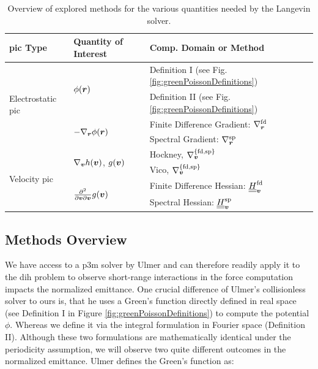 \begin{table}[h]
    \renewcommand*\arraystretch{1.5}
    \centering
    \caption{Overview of explored  methods for the various quantities needed by the Langevin solver.}
    \label{table:langevinPossibleMethods}
    \begin{tabular}{|l|l|l|}
\hline
\textbf{\gls{pic} Type}                           & \textbf{Quantity of Interest}
                                            & \textbf{Comp. Domain or Method}     \\ \hline
\multirow{4}{*}{Electrostatic \gls{pic}} & \multirow{2}{*}{$\phi(\boldsymbol{r})$}
                                         & Definition I (see Fig. \ref{fig:greenPoissonDefinitions})  \\ \cline{3-3} 
                                   &
                                   & Definition II (see Fig. \ref{fig:greenPoissonDefinitions})  \\ \cline{2-3} 
                                   & \multirow{2}{*}{$- \nabla_{\boldsymbol{r}} \phi(\boldsymbol{r})$}
                                   & Finite Difference Gradient: $\nabla_{\boldsymbol{r}}^{\text{fd}}$ \\ \cline{3-3} 
                                   &
                                   & Spectral Gradient: $\nabla_{\boldsymbol{r}}^{\text{sp}}$          \\ \hline
\multirow{4}{*}{Velocity \gls{pic}}      & \multirow{2}{*}{$\nabla_{\boldsymbol{v}} h(\boldsymbol{v})$, $g(\boldsymbol{v})$}
                                   & Hockney, $ \nabla_{\boldsymbol{v}}^{\{\text{fd,sp}\}} $                      \\ \cline{3-3} 
                                   &
                                   & Vico, $ \nabla_{\boldsymbol{v}}^{\{\text{fd,sp}\}} $                      \\ \cline{2-3} 
                                   & \multirow{2}{*}{$\frac{\partial^2}{\partial \boldsymbol{v} \partial
\boldsymbol{v}} g(\boldsymbol{v})$} & Finite Difference Hessian: $\underline{\underline{H}}_{\boldsymbol{v}}^{\text{fd}}$ \\ \cline{3-3} 
                                   &
                                   & Spectral Hessian: $\underline{\underline{H}}_{\boldsymbol{v}}^{\text{sp}}$           \\
\hline
\end{tabular}
\end{table}


\subsection{Methods Overview}

We have access to a \gls{p3m} solver by Ulmer \cite{p3m_ulmer} and can therefore readily 
apply it to the \gls{dih} problem to observe short-range interactions in the force
computation impacts the normalized emittance.
One crucial difference of Ulmer's collisionless solver to ours is, that he uses a Green's function 
directly defined in real space (see Definition I in Figure \ref{fig:greenPoissonDefinitions}) to
compute the potential $\phi$.
Whereas we define it via the integral formulation in Fourier space (Definition II).
Although these two formulations are mathematically identical under the periodicity assumption, 
we will observe two quite different outcomes in the normalized emittance.
Ulmer defines the Green's function as:

